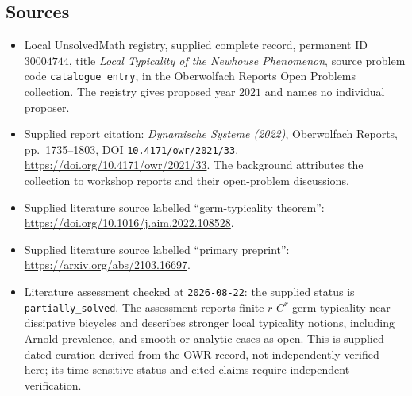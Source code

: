 \documentclass[11pt]{article}
\begin{document}
\subsection{Sources}
\begin{itemize}
\item Local UnsolvedMath registry, supplied complete record, permanent ID \(30004744\), title \emph{Local Typicality of the Newhouse Phenomenon}, source problem code \texttt{catalogue entry}, in the Oberwolfach Reports Open Problems collection. The registry gives proposed year \(2021\) and names no individual proposer.
\item Supplied report citation: \emph{Dynamische Systeme (2022)}, Oberwolfach Reports, pp.~1735--1803, DOI \texttt{10.4171/owr/2021/33}. \url{https://doi.org/10.4171/owr/2021/33}. The background attributes the collection to workshop reports and their open-problem discussions.
\item Supplied literature source labelled ``germ-typicality theorem'': \url{https://doi.org/10.1016/j.aim.2022.108528}.
\item Supplied literature source labelled ``primary preprint'': \url{https://arxiv.org/abs/2103.16697}.
\item Literature assessment checked at \texttt{2026-08-22}: the supplied status is \texttt{partially\_solved}. The assessment reports finite-\(r\) \(C^r\) germ-typicality near dissipative bicycles and describes stronger local typicality notions, including Arnold prevalence, and smooth or analytic cases as open. This is supplied dated curation derived from the OWR record, not independently verified here; its time-sensitive status and cited claims require independent verification.
\end{itemize}
\end{document}
